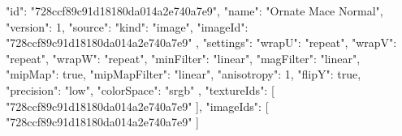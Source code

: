 {
  "id": "728ccf89c91d18180da014a2e740a7e9",
  "name": "Ornate Mace Normal",
  "version": 1,
  "source": {
    "kind": "image",
    "imageId": "728ccf89c91d18180da014a2e740a7e9"
  },
  "settings": {
    "wrapU": "repeat",
    "wrapV": "repeat",
    "wrapW": "repeat",
    "minFilter": "linear",
    "magFilter": "linear",
    "mipMap": true,
    "mipMapFilter": "linear",
    "anisotropy": 1,
    "flipY": true,
    "precision": "low",
    "colorSpace": "srgb"
  },
  "textureIds": [
    "728ccf89c91d18180da014a2e740a7e9"
  ],
  "imageIds": [
    "728ccf89c91d18180da014a2e740a7e9"
  ]
}
